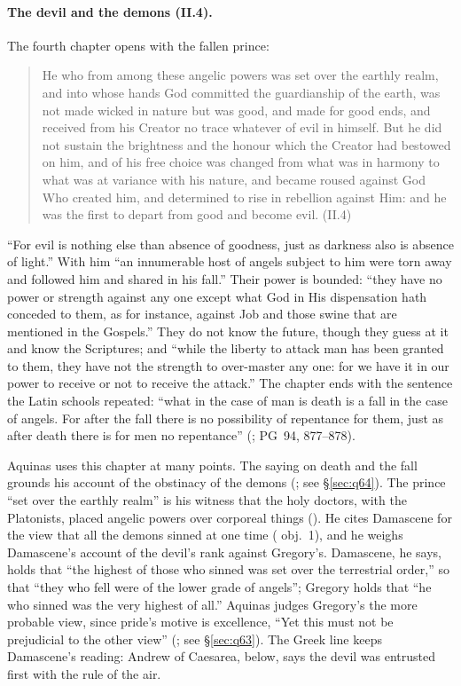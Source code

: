 \paragraph{The devil and the demons (II.4).} The fourth chapter opens with
the fallen prince:

\begin{quote}
He who from among these angelic powers was set over the earthly realm, and
into whose hands God committed the guardianship of the earth, was not made
wicked in nature but was good, and made for good ends, and received from his
Creator no trace whatever of evil in himself. But he did not sustain the
brightness and the honour which the Creator had bestowed on him, and of his
free choice was changed from what was in harmony to what was at variance
with his nature, and became roused against God Who created him, and
determined to rise in rebellion against Him: and he was the first to depart
from good and become evil. (II.4)
\end{quote}

\noindent ``For evil is nothing else than absence of goodness, just as
darkness also is absence of light.'' With him ``an innumerable host of
angels subject to him were torn away and followed him and shared in his
fall.'' Their power is bounded: ``they have no power or strength against any
one except what God in His dispensation hath conceded to them, as for
instance, against Job and those swine that are mentioned in the Gospels.''
They do not know the future, though they guess at it and know the
Scriptures; and ``while the liberty to attack man has been granted to them,
they have not the strength to over-master any one: for we have it in our
power to receive or not to receive the attack.'' The chapter ends with the
sentence the Latin schools repeated: ``what in the case of man is death is a
fall in the case of angels. For after the fall there is no possibility of
repentance for them, just as after death there is for men no repentance''
(; PG~94, 877--878).

Aquinas uses this chapter at many points. The saying on death and the fall
grounds his account of the obstinacy of the demons (; see
\S\ref{sec:q64}). The prince ``set over the earthly realm'' is his witness
that the holy doctors, with the Platonists, placed angelic powers over
corporeal things (). He cites Damascene for the view that
all the demons sinned at one time ( obj.~1), and he weighs
Damascene's account of the devil's rank against Gregory's. Damascene, he
says, holds that ``the highest of those who sinned was set over the
terrestrial order,'' so that ``they who fell were of the lower grade of
angels''; Gregory holds that ``he who sinned was the very highest of all.''
Aquinas judges Gregory's the more probable view, since pride's motive is
excellence, ``Yet this must not be prejudicial to the other view'' (; see \S\ref{sec:q63}). The Greek line keeps Damascene's reading:
Andrew of Caesarea, below, says the devil was entrusted first with the rule
of the air.

